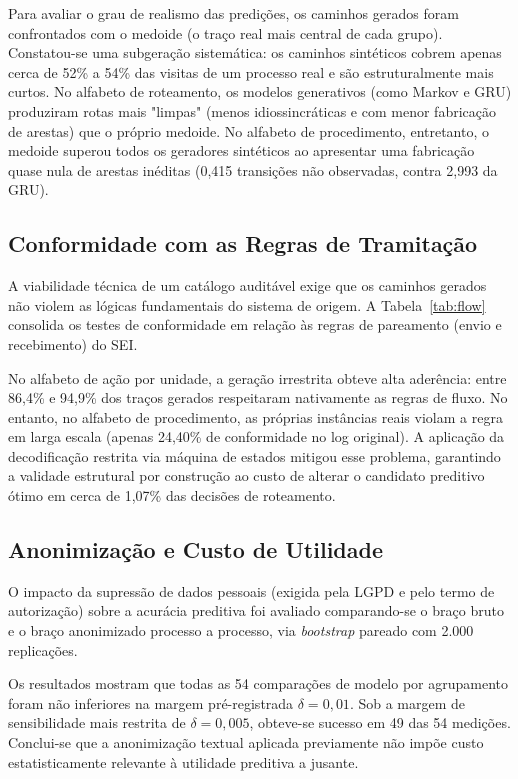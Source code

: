 

Para avaliar o grau de realismo das predições, os caminhos gerados foram confrontados com o medoide (o traço real mais central de cada grupo). Constatou-se uma subgeração sistemática: os caminhos sintéticos cobrem apenas cerca de 52\% a 54\% das visitas de um processo real e são estruturalmente mais curtos. No alfabeto de roteamento, os modelos generativos (como Markov e GRU) produziram rotas mais "limpas" (menos idiossincráticas e com menor fabricação de arestas) que o próprio medoide. No alfabeto de procedimento, entretanto, o medoide superou todos os geradores sintéticos ao apresentar uma fabricação quase nula de arestas inéditas (0,415 transições não observadas, contra 2,993 da GRU).

\subsection{Conformidade com as Regras de Tramitação}\label{sec:res-conformidade}

A viabilidade técnica de um catálogo auditável exige que os caminhos gerados não violem as lógicas fundamentais do sistema de origem. A Tabela~\ref{tab:flow} consolida os testes de conformidade em relação às regras de pareamento (envio e recebimento) do SEI.



No alfabeto de ação por unidade, a geração irrestrita obteve alta aderência: entre 86,4\% e 94,9\% dos traços gerados respeitaram nativamente as regras de fluxo. No entanto, no alfabeto de procedimento, as próprias instâncias reais violam a regra em larga escala (apenas 24,40\% de conformidade no log original). A aplicação da decodificação restrita via máquina de estados mitigou esse problema, garantindo a validade estrutural por construção ao custo de alterar o candidato preditivo ótimo em cerca de 1,07\% das decisões de roteamento.

\subsection{Anonimização e Custo de Utilidade}\label{sec:res-anon}

O impacto da supressão de dados pessoais (exigida pela LGPD e pelo termo de autorização) sobre a acurácia preditiva foi avaliado comparando-se o braço bruto e o braço anonimizado processo a processo, via \emph{bootstrap} pareado com 2.000 replicações. 

Os resultados mostram que todas as 54 comparações de modelo por agrupamento foram não inferiores na margem pré-registrada $\delta = 0{,}01$. Sob a margem de sensibilidade mais restrita de $\delta = 0{,}005$, obteve-se sucesso em 49 das 54 medições. Conclui-se que a anonimização textual aplicada previamente não impõe custo estatisticamente relevante à utilidade preditiva a jusante.

